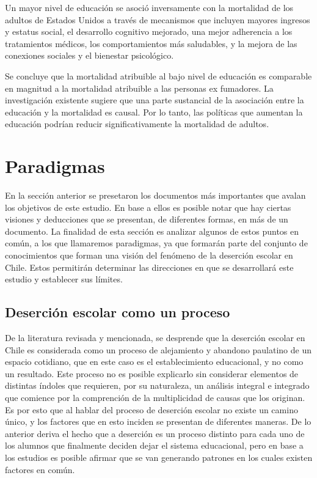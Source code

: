 Un mayor nivel de educación se asoció inversamente con la mortalidad de los adultos de Estados Unidos a través de mecanismos que incluyen mayores ingresos y estatus social, el desarrollo cognitivo mejorado, una mejor adherencia a los tratamientos médicos, los comportamientos más saludables, y la mejora de las conexiones sociales y el bienestar psicológico.

Se concluye que la mortalidad atribuible al bajo nivel de educación es comparable en magnitud a la mortalidad atribuible a las personas ex fumadores. La investigación existente sugiere que una parte sustancial de la asociación entre la educación y la mortalidad es causal. Por lo tanto, las políticas que aumentan la educación podrían reducir significativamente la mortalidad de adultos.

\section{Paradigmas}
En la sección anterior se presetaron los documentos más importantes que avalan los objetivos de este estudio. 
En base a ellos es posible notar que hay ciertas visiones y deducciones que se presentan, de diferentes formas, en más de un documento. La finalidad de esta sección es analizar algunos de estos puntos en común, a los que llamaremos paradigmas, ya que formarán parte del conjunto de conocimientos que forman una visión del fenómeno de la deserción escolar en Chile. Estos permitirán determinar las direcciones en que se desarrollará este estudio y establecer sus límites. 

\subsection{Deserción escolar como un proceso}
De la literatura revisada y mencionada, se desprende que la deserción escolar en Chile es considerada como un proceso de alejamiento y abandono paulatino de un espacio cotidiano, que en este caso es el establecimiento educacional, y no como un resultado.
Este proceso no es posible explicarlo sin considerar elementos de distintas índoles que requieren, por su naturaleza, un análisis integral e integrado que comience por la comprención de la multiplicidad de causas que los originan. Es por esto que al hablar del proceso de deserción escolar no existe un camino único, y los factores que en esto inciden se presentan de diferentes maneras.
De lo anterior deriva el hecho que a deserción es un proceso distinto para cada uno de los alumnos que finalmente deciden dejar el sistema educacional, pero en base a los estudios es posible afirmar que se van generando patrones en los cuales existen factores en común. 

